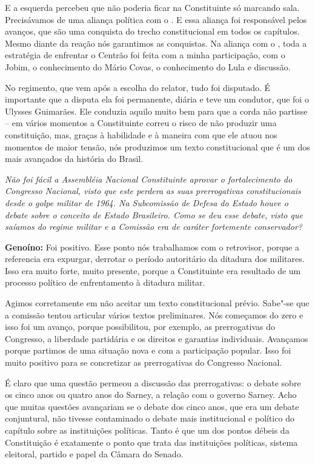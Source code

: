 E a esquerda percebeu que não poderia ficar na Constituinte só marcando
sala. Precisávamos de uma aliança política com o . E essa aliança
foi responsável pelos avanços, que são uma conquista do trecho
constitucional em todos os capítulos. Mesmo diante da reação nós
garantimos as conquistas. Na aliança com o , toda a estratégia de
enfrentar o Centrão foi feita com a minha participação, com o Jobim, o
conhecimento do Mário Covas, o conhecimento do Lula e discussão.

No regimento, que vem após a escolha do relator, tudo foi disputado. É
importante que a disputa ela foi permanente, diária e teve um condutor,
que foi o Ulysses Guimarães. Ele conduzia aquilo muito bem para que a
corda não partisse -- em vários momentos a Constituinte correu o risco
de não produzir uma constituição, mas, graças à habilidade e à maneira
com que ele atuou nos momentos de maior tensão, nós produzimos um texto
constitucional que é um dos mais avançados da história do Brasil.

\emph{Não foi fácil a Assembléia Nacional Constituinte aprovar o
fortalecimento do Congresso Nacional, visto que este perdera as suas
prerrogativas constitucionais desde o golpe militar de 1964. Na
Subcomissão de Defesa do Estado houve o debate sobre o conceito de
Estado Brasileiro. Como se deu esse debate, visto que saíamos do regime
militar e a Comissão era de caráter fortemente conservador?}

\textbf{Genoíno:} Foi positivo. Esse ponto nós trabalhamos com o
retrovisor, porque a referencia era expurgar, derrotar o período
autoritário da ditadura dos militares. Isso era muito forte, muito
presente, porque a Constituinte era resultado de um processo político de
enfrentamento à ditadura militar.

Agimos corretamente em não aceitar um texto constitucional prévio.
Sabe"-se que a comissão tentou articular vários textos preliminares. Nós
começamos do zero e isso foi um avanço, porque possibilitou, por
exemplo, as prerrogativas do Congresso, a liberdade partidária e os
direitos e garantias individuais. Avançamos porque partimos de uma
situação nova e com a participação popular. Isso foi muito positivo para
se concretizar as prerrogativas do Congresso Nacional.

É claro que uma questão permeou a discussão das prerrogativas: o debate
sobre os cinco anos ou quatro anos do Sarney, a relação com o governo
Sarney. Acho que muitas questões avançariam se o debate dos cinco anos,
que era um debate conjuntural, não tivesse contaminado o debate mais
institucional e político do capítulo sobre as instituições políticas.
Tanto é que um dos pontos débeis da Constituição é exatamente o ponto
que trata das instituições políticas, sistema eleitoral, partido e papel
da Câmara do Senado.

